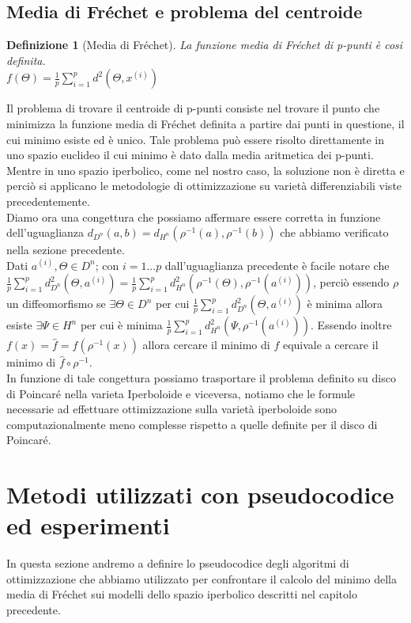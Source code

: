 \documentclass[a4paper, 12pt]{article}
\newtheorem{definition}{Definizione}
\begin{document}
\subsection{Media di Fréchet e problema del centroide}
\begin{definition}[Media di Fréchet]
La funzione media di Fréchet di p-punti è cosi definita.\\
$f(\Theta) = \frac{1}{p}\sum_{i=1}^p d^2(\Theta, x^{(i)})$
\end{definition}
Il problema di trovare il centroide di p-punti consiste nel trovare il punto che minimizza la funzione media di Fréchet definita a partire dai punti in questione, il cui minimo esiste ed è unico. Tale problema può essere risolto direttamente in uno spazio euclideo il cui minimo è dato dalla media aritmetica dei p-punti. Mentre in uno spazio iperbolico, come nel nostro caso, la soluzione non è diretta e perciò si applicano le metodologie di ottimizzazione su varietà differenziabili viste precedentemente.\\
Diamo ora una congettura che possiamo affermare essere corretta in funzione dell'uguaglianza $d_{D^n}(a, b) = d_{H^n}(\rho^{-1}(a), \rho^{-1}(b))$ che abbiamo verificato nella sezione precedente.\\
Dati $a^{(i)}, \Theta \in D^n$; con $i = 1...p$ dall'uguaglianza precedente è facile notare che $\frac{1}{p}\sum_{i=1}^p d_{D^n}^2(\Theta, a^{(i)}) = \frac{1}{p}\sum_{i=1}^p d_{H^n}^2(\rho^{-1}(\Theta), \rho^{-1}(a^{(i)}))$, perciò essendo $\rho$ un diffeomorfismo se $\exists \Theta \in D^n$ per cui $\frac{1}{p}\sum_{i=1}^p d_{D^n}^2(\Theta, a^{(i)})$ è minima allora esiste $\exists \Psi \in H^n$ per cui è minima $\frac{1}{p}\sum_{i=1}^p d_{H^n}^2(\Psi, \rho^{-1}(a^{(i)}))$. Essendo inoltre $f(x) = \hat{f} = f(\rho^{-1}(x))$ allora cercare il minimo di $f$ equivale a cercare il minimo di $\hat{f} \circ \rho^{-1}$.\\
In funzione di tale congettura possiamo trasportare il problema definito su disco di Poincaré nella varieta Iperboloide e viceversa, notiamo che le formule necessarie ad effettuare ottimizzazione sulla varietà iperboloide sono computazionalmente meno complesse rispetto a quelle definite per il disco di Poincaré.
\section{Metodi utilizzati con pseudocodice ed esperimenti}
In questa sezione andremo a definire lo pseudocodice degli algoritmi di ottimizzazione che abbiamo utilizzato per confrontare il calcolo del minimo della media di Fréchet sui modelli dello spazio iperbolico descritti nel capitolo precedente.
\end{document}
